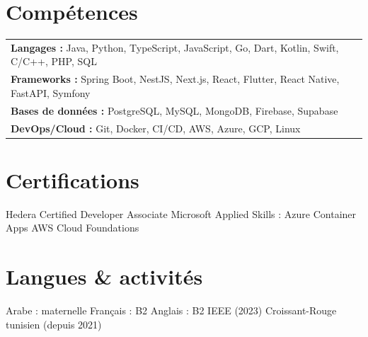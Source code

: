 \documentclass[10.5pt,a4paper]{article}
\begin{document}
\section*{Compétences}
\begin{tabular}{@{\hspace{0.6em}}l}
  \textbf{Langages :} Java, Python, TypeScript, JavaScript, Go, Dart, Kotlin, Swift, C/C++, PHP, SQL\\
  \textbf{Frameworks :} Spring Boot, NestJS, Next.js, React, Flutter, React Native, FastAPI, Symfony\\
  \textbf{Bases de données :} PostgreSQL, MySQL, MongoDB, Firebase, Supabase\\
  \textbf{DevOps/Cloud :} Git, Docker, CI/CD, AWS, Azure, GCP, Linux
\end{tabular}

\section*{Certifications}
Hedera Certified Developer Associate \textbullet{} Microsoft Applied Skills : Azure Container Apps \textbullet{} AWS Cloud Foundations

\section*{Langues \& activités}
Arabe : maternelle \quad Français : B2 \quad Anglais : B2 \quad\textbar\quad IEEE (2023) \quad Croissant-Rouge tunisien (depuis 2021)
\end{document}
